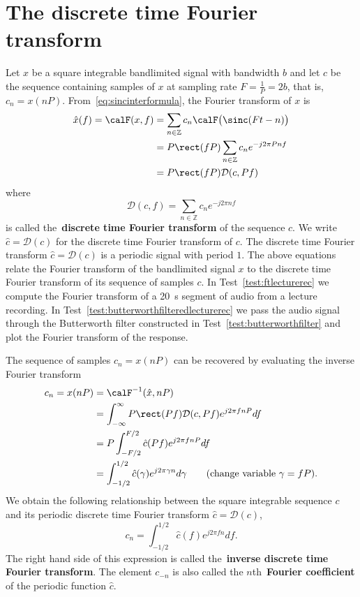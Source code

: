 \documentclass[11pt,a4paper]{book}
\theoremstyle{plain}
\numberwithin{equation}{section}
\newcommand{\ints}{{\mathbb Z}}
\newcommand{\complex}{{\mathbb C}}
\newcommand{\term}{\textbf}
\newcounter{test}
\begin{document}
\section{The discrete time Fourier transform}

\newcommand{\calD}{{\mathcal D}}

Let $x$ be a square integrable bandlimited signal with bandwidth $b$ and let $c$ be the sequence containing samples of $x$ at sampling rate $F = \tfrac{1}{P} = 2b$, that is, $c_n = x(nP)$.  From~\eqref{eq:sincinterformula}, the Fourier transform of $x$ is %
\begin{align}
\hat{x}(f) = \calF(x,f) &= \sum_{n \in \ints} c_n \calF\big(\sinc(F t - n) \big)  \nonumber \\
&= P \rect( f P ) \sum_{n \in \ints} c_n e^{-j 2\pi P n f } \nonumber \\
&= P \rect( f P ) \calD(c, Pf) \qquad \label{eq:ftanddftrelationship}
\end{align}
where
\[
\calD(c, f) = \sum_{n \in \ints} c_n e^{-j 2\pi n f}
\]
is called the~\term{discrete time Fourier transform} of the sequence $c$.  We write $\hat{c} = \calD(c)$ for the discrete time Fourier transform of $c$.  The discrete time Fourier transform $\hat{c} = \calD(c)$ is a periodic signal with period $1$.  The above equations relate the Fourier transform of the bandlimited signal $x$ to the discrete time Fourier transform of its sequence of samples $c$.  In Test~\ref{test:ftlecturerec} we compute the Fourier transform of a \SI{20}{\second} segment of audio from a lecture recording.  In Test~\ref{test:butterworthfilteredlecturerec} we pass the audio signal through the Butterworth filter constructed in Test~\ref{test:butterworthfilter} and plot the Fourier transform of the response.

The sequence of samples $c_n = x(nP)$ can be recovered by evaluating the inverse Fourier transform
\begin{align*}
c_n = x(nP) &= \calF^{-1}(\hat{x}, nP) \\
&= \int_{-\infty}^\infty P \rect(Pf) \calD(c,Pf) e^{j2\pi f nP} df \\
&= P \int_{-F/2}^{F/2} \hat{c}(Pf) e^{j2\pi f nP } df \\
&= \int_{-1/2}^{1/2} \hat{c}(\gamma) e^{j 2\pi \gamma n } d\gamma \qquad \text{(change variable $\gamma = fP$)}.
\end{align*}
We obtain the following relationship between the square integrable sequence $c$ and its periodic discrete time Fourier transform $\hat{c} = \calD(c)$,
\[
c_n = \int_{-1/2}^{1/2} \hat{c}(f) e^{j 2\pi f n } df.
\]
The right hand side of this expression is called the~\term{inverse discrete time Fourier transform}.  %
The element $c_{-n}$ is also called the $n$th~\term{Fourier coefficient} of the periodic function $\hat{c}$.
\end{document}
